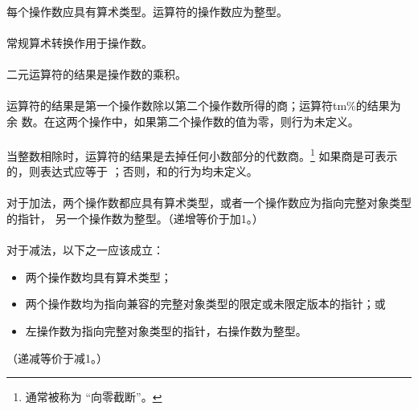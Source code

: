 {\constraint
\paragraph{}
每个操作数应具有算术类型。\tm{\%}运算符的操作数应为整型。

\semantic
\paragraph{}
常规算术转换作用于操作数。

\paragraph{}
二元\tm{*}运算符的结果是操作数的乘积。

\paragraph{}
运算符\tm{/}的结果是第一个操作数除以第二个操作数所得的商；运算符tm{\%}的结果为余
数。在这两个操作中，如果第二个操作数的值为零，则行为未定义。

\paragraph{}
当整数相除时，\tm{/}运算符的结果是去掉任何小数部分的代数商。\footnote{通常被称为
``向零截断''。} 如果商是可表示的，则表达式应等于
；否则，和的行为均未定义。

\syntax
\paragraph{}

\constraint
\paragraph{}
对于加法，两个操作数都应具有算术类型，或者一个操作数应为指向完整对象类型的指针，
另一个操作数为整型。（递增等价于加1。）

\paragraph{}
对于减法，以下之一应该成立：
\begin{itemize}
  \item{两个操作数均具有算术类型；}
  \item{两个操作数均为指向兼容的完整对象类型的限定或未限定版本的指针；或}
  \item{左操作数为指向完整对象类型的指针，右操作数为整型。}
\end{itemize}
（递减等价于减1。）

}
